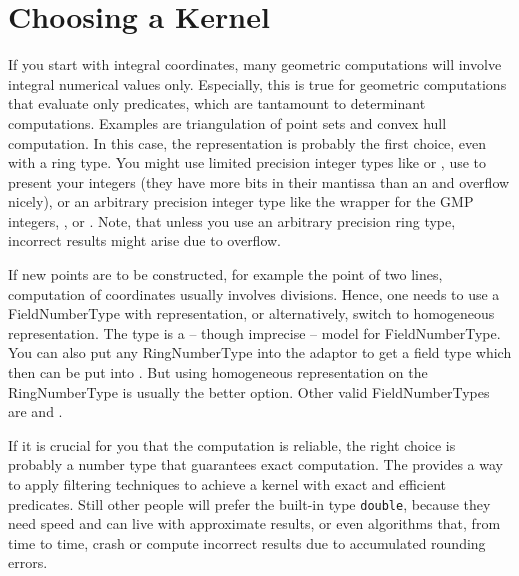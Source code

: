 \section{Choosing a Kernel}
If you start with integral  coordinates,
many geometric computations will involve integral numerical values
only. Especially, this is true for geometric computations that
evaluate only predicates, which are tantamount to determinant
computations. Examples are triangulation of point sets and convex hull
computation.  In this case, the 
representation is probably the first choice, even with a ring type.
You might use limited precision integer types like  or
, use  to present your integers (they have more
bits in their mantissa than an  and overflow nicely), or an
arbitrary precision integer type like the wrapper  for the
GMP integers, , or . Note, that unless
you use an arbitrary precision ring type, incorrect results might
arise due to overflow.

If new points are to be constructed, for example the
 point of two lines, computation of
 coordinates usually involves divisions.
Hence, one needs to use a FieldNumberType with
 representation, or alternatively, switch
to homogeneous representation. The type  is a -- though
imprecise -- model for FieldNumberType. You can also put any
RingNumberType into the  adaptor to get a field type
which then can be put into . But using homogeneous
representation on the RingNumberType is usually the better option.
Other valid FieldNumberTypes are  and
.

If it is crucial for you that the computation is reliable, the right
choice is probably a number type that guarantees exact computation.
The  provides a way to apply filtering techniques
\cite{bbp-iayea-98} to achieve a kernel with exact and efficient
predicates. %
Still other people will prefer the built-in
type {\tt double}, because they need speed and can live with
approximate results, or even algorithms that, from time to time,
crash or compute incorrect results due to accumulated rounding errors.
